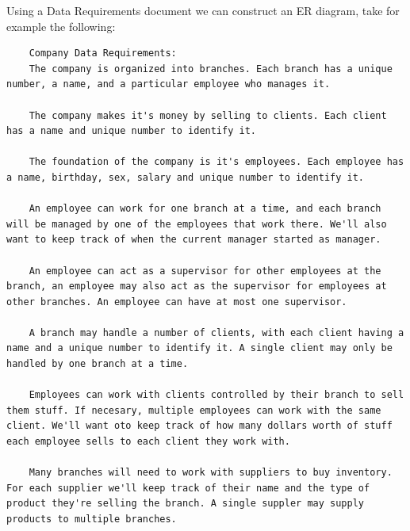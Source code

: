 Using a Data Requirements document we can construct an ER diagram, take for example the following:
\begin{verbatim}
    Company Data Requirements:
    The company is organized into branches. Each branch has a unique number, a name, and a particular employee who manages it.

    The company makes it's money by selling to clients. Each client has a name and unique number to identify it.

    The foundation of the company is it's employees. Each employee has a name, birthday, sex, salary and unique number to identify it.

    An employee can work for one branch at a time, and each branch will be managed by one of the employees that work there. We'll also want to keep track of when the current manager started as manager.

    An employee can act as a supervisor for other employees at the branch, an employee may also act as the supervisor for employees at other branches. An employee can have at most one supervisor.

    A branch may handle a number of clients, with each client having a name and a unique number to identify it. A single client may only be handled by one branch at a time.

    Employees can work with clients controlled by their branch to sell them stuff. If necesary, multiple employees can work with the same client. We'll want oto keep track of how many dollars worth of stuff each employee sells to each client they work with.

    Many branches will need to work with suppliers to buy inventory. For each supplier we'll keep track of their name and the type of product they're selling the branch. A single suppler may supply products to multiple branches.
\end{verbatim}

